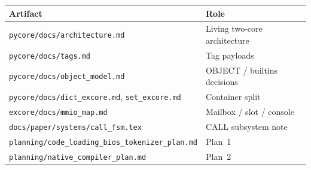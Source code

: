 \documentclass[11pt,a4paper]{article}
\begin{document}
\begin{center}
\small
\begin{tabular}{@{}lp{}@{}}
\toprule
Artifact & Role \\
\midrule
\texttt{pycore/docs/architecture.md} & Living two-core architecture \\
\texttt{pycore/docs/tags.md} & Tag payloads \\
\texttt{pycore/docs/object\_model.md} & OBJECT / builtins decisions \\
\texttt{pycore/docs/dict\_excore.md}, \texttt{set\_excore.md} & Container split \\
\texttt{excore/docs/mmio\_map.md} & Mailbox / slot / console \\
\texttt{docs/paper/systems/call\_fsm.tex} & CALL subsystem note \\
\texttt{planning/code\_loading\_bios\_tokenizer\_plan.md} & Plan~1 \\
\texttt{planning/native\_compiler\_plan.md} & Plan~2 \\
\bottomrule
\end{tabular}
\end{center}
\end{document}
